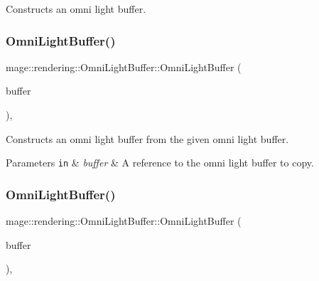 Constructs an omni light buffer. \hypertarget{structmage_1_1rendering_1_1_omni_light_buffer_a716417506a93d27a0093b408e88f92e4}{}\label{structmage_1_1rendering_1_1_omni_light_buffer_a716417506a93d27a0093b408e88f92e4} 
\subsubsection{\texorpdfstring{Omni\+Light\+Buffer()}{OmniLightBuffer()}\hspace{0.1cm}{\footnotesize\ttfamily [2/3]}}
{\footnotesize\ttfamily mage\+::rendering\+::\+Omni\+Light\+Buffer\+::\+Omni\+Light\+Buffer (\begin{DoxyParamCaption}\item[{const \hyperlink{structmage_1_1rendering_1_1_omni_light_buffer}{Omni\+Light\+Buffer} \&}]{buffer }\end{DoxyParamCaption})\hspace{0.3cm}{\ttfamily [default]}, {\ttfamily [noexcept]}}

Constructs an omni light buffer from the given omni light buffer.


\begin{DoxyParams}[1]{Parameters}
\mbox{\tt in}  & {\em buffer} & A reference to the omni light buffer to copy. \\
\hline
\end{DoxyParams}
\hypertarget{structmage_1_1rendering_1_1_omni_light_buffer_a8a1a458735f88d1dbd86590f1807c0a4}{}\label{structmage_1_1rendering_1_1_omni_light_buffer_a8a1a458735f88d1dbd86590f1807c0a4} 
\subsubsection{\texorpdfstring{Omni\+Light\+Buffer()}{OmniLightBuffer()}\hspace{0.1cm}{\footnotesize\ttfamily [3/3]}}
{\footnotesize\ttfamily mage\+::rendering\+::\+Omni\+Light\+Buffer\+::\+Omni\+Light\+Buffer (\begin{DoxyParamCaption}\item[{\hyperlink{structmage_1_1rendering_1_1_omni_light_buffer}{Omni\+Light\+Buffer} \&\&}]{buffer }\end{DoxyParamCaption})\hspace{0.3cm}{\ttfamily [default]}, {\ttfamily [noexcept]}}

